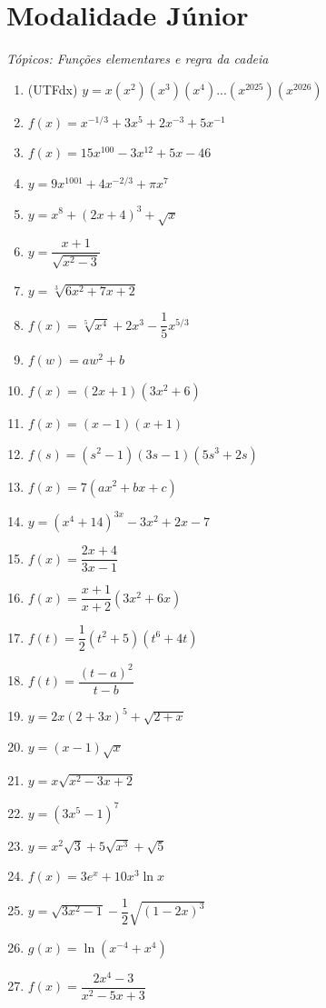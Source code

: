 \documentclass[12pt]{article}
\begin{document}
	\section*{Modalidade Júnior} \textit{Tópicos: Funções elementares e regra da cadeia}
		\begin{enumerate}
			\item (UTFdx) $y=x(x^{2})(x^{3})(x^{4})...(x^{2025})(x^{2026})$
			\item $f(x)=x^{{-1}/{3}}+3x^{5}+2x^{-3}+5x^{-1}$
			\item $f(x)=15x^{100}-3x^{12}+5x-46$ %
			\item $y=9x^{1001}+4x^{{-2}/{3}}+\pi x^{7}$
			\item $y=x^{8}+(2x+4)^{3}+\sqrt{x}$
			\item $y=\dfrac{x+1}{\sqrt{x^{2}-3}}$
			\item $y=\sqrt[3]{6x^{2}+7x+2}$
			\item $f(x)=\sqrt[5]{x^{4}}+2x^{3}-\dfrac{1}{5}x^{{5}/{3}}$
			\item $f(w)=aw^{2}+b$
			\item $f(x)=(2x+1)(3x^{2}+6)$
			\item $f(x)=(x-1)(x+1)$
			\item $f(s)=(s^{2}-1)(3s-1)(5s^{3}+2s)$
			\item $f(x)=7(ax^{2}+bx+c)$
			\item $y=(x^{4}+14)^{3x}-3x^{2}+2x-7$
			\item $f(x)=\dfrac{2x+4}{3x-1}$
			\item $f(x)=\dfrac{x+1}{x+2}\left( 3x^{2}+6x \right)$
			\item $f(t)=\dfrac{1}{2}\left( t^{2}+5 \right)\left( t^{6}+4t \right)$
			\item $f(t)=\dfrac{(t-a)^{2}}{t-b}$
			\item $y=2x(2+3x)^{5}+\sqrt{2+x}$
			\item $y=(x-1)\sqrt{x}$
			\item $y=x\sqrt{x^{2}-3x+2}$
			\item $y=(3x^{5}-1)^{7}$
			\item $y=x^{2}\sqrt{3}+5\sqrt{x^{3}}+\sqrt{5}$
			\item $f(x)=3e^{x}+10x^{3}\ln x$ %
			\item $y=\sqrt{3x^{2}-1}-\dfrac{1}{2}\sqrt{(1-2x)^{3}}$ 
			\item $g(x)=\ln (x^{-4}+x^{4})$ %
			\item $f(x)=\dfrac{2x^{4}-3}{x^{2}-5x+3}$

\end{enumerate}
\end{document}
